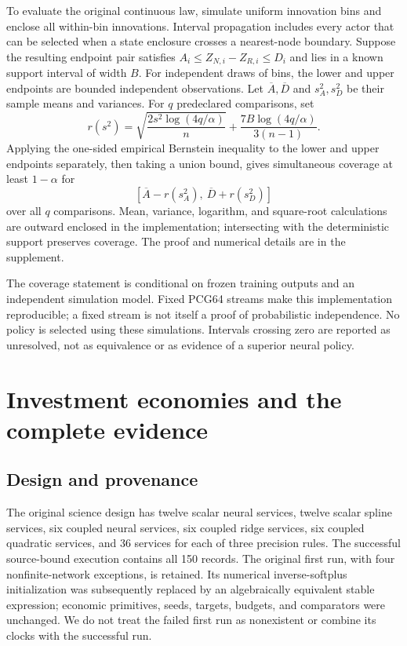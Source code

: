 \documentclass[ecta,nameyear,draft]{econsocart}
\begin{document}
To evaluate the original continuous law, simulate uniform innovation bins and enclose all within-bin innovations. Interval propagation includes every actor that can be selected when a state enclosure crosses a nearest-node boundary. Suppose the resulting endpoint pair satisfies $A_i\leq Z_{N,i}-Z_{R,i}\leq D_i$ and lies in a known support interval of width $B$. For independent draws of bins, the lower and upper endpoints are bounded independent observations. Let $\overline A,\overline D$ and $s_A^2,s_D^2$ be their sample means and variances. For $q$ predeclared comparisons, set
\begin{equation}\label{eq:bernstein}
 r(s^2)=\sqrt{\frac{2s^2\log(4q/\alpha)}{n}}
           +\frac{7B\log(4q/\alpha)}{3(n-1)}.
\end{equation}
Applying the one-sided empirical Bernstein inequality to the lower and upper endpoints separately, then taking a union bound, gives simultaneous coverage at least $1-\alpha$ for
\begin{equation}\label{eq:ci}
 [\overline A-r(s_A^2),\ \overline D+r(s_D^2)]
\end{equation}
over all $q$ comparisons. Mean, variance, logarithm, and square-root calculations are outward enclosed in the implementation; intersecting with the deterministic support preserves coverage. The proof and numerical details are in the supplement.

The coverage statement is conditional on frozen training outputs and an independent simulation model. Fixed PCG64 streams make this implementation reproducible; a fixed stream is not itself a proof of probabilistic independence. No policy is selected using these simulations. Intervals crossing zero are reported as unresolved, not as equivalence or as evidence of a superior neural policy.

\section{Investment economies and the complete evidence}\label{sec:evidence}
\subsection{Design and provenance}
The original science design has twelve scalar neural services, twelve scalar spline services, six coupled neural services, six coupled ridge services, six coupled quadratic services, and 36 services for each of three precision rules. The successful source-bound execution contains all 150 records. The original first run, with four nonfinite-network exceptions, is retained. Its numerical inverse-softplus initialization was subsequently replaced by an algebraically equivalent stable expression; economic primitives, seeds, targets, budgets, and comparators were unchanged. We do not treat the failed first run as nonexistent or combine its clocks with the successful run.
\end{document}
